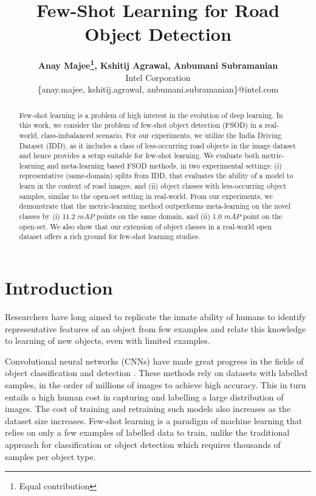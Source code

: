 \documentclass[letterpaper]{article} %
\title{Few-Shot Learning for Road Object Detection}
\author{
\Large \textbf{
Anay Majee\thanks{Equal contribution},
Kshitij Agrawal\footnotemark[1],
Anbumani Subramanian
} \\ 
Intel Corporation\\ 
\{anay.majee, kshitij.agrawal, anbumani.subramanian\}@intel.com
}
\begin{document}
\maketitle

\begin{abstract}
Few-shot learning is a problem of high interest in the evolution of deep learning. In this work, we consider the problem of few-shot object detection (FSOD) in a real-world, class-imbalanced scenario. For our experiments, we utilize the India Driving Dataset (IDD), as it includes a class of less-occurring road objects in the image dataset and hence provides a setup suitable for few-shot learning. We evaluate both metric-learning and meta-learning based FSOD methods, in two experimental settings: (i) representative (same-domain) splits from IDD, that evaluates the ability of a model to learn in the context of road images, and (ii) object classes with less-occurring object samples, similar to the open-set setting in real-world. From our experiments, we demonstrate that the metric-learning method outperforms meta-learning on the novel classes by (i) 11.2 $mAP$ points on the same domain, and (ii) 1.0 $mAP$ point on the open-set. We also show that our extension of object classes in a real-world open dataset offers a rich ground for few-shot learning studies.
\end{abstract}

\section{Introduction}

Researchers have long aimed to replicate the innate ability of humans to identify representative features of an object from few examples and relate this knowledge to learning of new objects, even with limited examples. 

Convolutional neural networks (CNNs) have made great progress in the fields of object classification \cite{resnet} and detection \cite{yolo1,ssd,faster-rcnn}. These methods rely on datasets with labelled samples, in the order of millions of images to achieve high accuracy. This in turn entails a high human cost in capturing and labelling a large distribution of images. The cost of training and retraining such models also increases as the dataset size increases. Few-shot learning is a paradigm of machine learning that relies on only a few examples of labelled data to train, unlike the traditional approach for classification or object detection which requires thousands of samples per object type.
\end{document}

